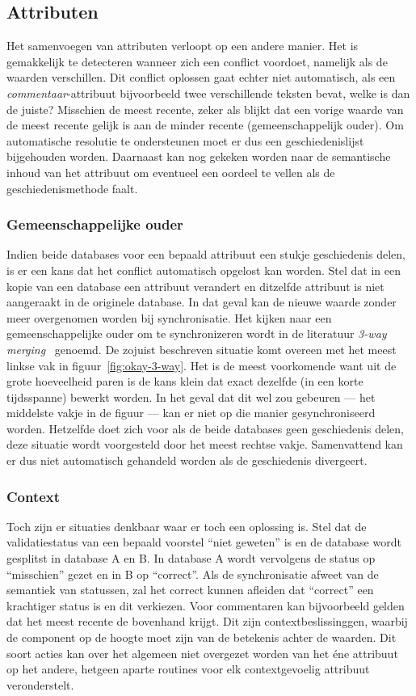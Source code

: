 \subsection{Attributen}
Het samenvoegen van attributen verloopt op een andere manier. Het is gemakkelijk te detecteren wanneer zich een conflict voordoet, namelijk als de waarden verschillen. Dit conflict oplossen gaat echter niet automatisch, als een \emph{commentaar}-attribuut bijvoorbeeld twee verschillende teksten bevat, welke is dan de juiste? Misschien de meest recente, zeker als blijkt dat een vorige waarde van de meest recente gelijk is aan de minder recente (gemeenschappelijk ouder). Om automatische resolutie te ondersteunen moet er dus een geschiedenislijst bijgehouden worden. Daarnaast kan nog gekeken worden naar de semantische inhoud van het attribuut om eventueel een oordeel te vellen als de geschiedenismethode faalt.

\subsubsection{Gemeenschappelijke ouder}
Indien beide databases voor een bepaald attribuut een stukje geschiedenis delen, is er een kans dat het conflict automatisch opgelost kan worden. Stel dat in een kopie van een database een attribuut verandert en ditzelfde attribuut is niet aangeraakt in de originele database. In dat geval kan de nieuwe waarde zonder meer overgenomen worden bij synchronisatie. Het kijken naar een gemeenschappelijke ouder om te synchronizeren wordt in de literatuur \emph{3-way merging}~\cite{sync:diff3} genoemd. De zojuist beschreven situatie komt overeen met het meest linkse vak in figuur~\ref{fig:okay-3-way}. Het is de meest voorkomende want uit de grote hoeveelheid paren is de kans klein dat exact dezelfde (in een korte tijdsspanne) bewerkt worden. In het geval dat dit wel zou gebeuren --- het middelste vakje in de figuur --- kan er niet op die manier gesynchroniseerd worden. Hetzelfde doet zich voor als de beide databases geen geschiedenis delen, deze situatie wordt voorgesteld door het meest rechtse vakje. Samenvattend kan er dus niet automatisch gehandeld worden als de geschiedenis divergeert.

\subsubsection{Context}
Toch zijn er situaties denkbaar waar er toch een oplossing is. Stel dat de validatiestatus van een bepaald voorstel ``niet geweten'' is en de database wordt gesplitst in database A en B. In database A wordt vervolgens de status op ``misschien'' gezet en in B op ``correct''. Als de synchronisatie afweet van de semantiek van statussen, zal het correct kunnen afleiden dat ``correct'' een krachtiger status is en dit verkiezen. Voor commentaren kan bijvoorbeeld gelden dat het meest recente de bovenhand krijgt. Dit zijn contextbeslissinggen, waarbij de component op de hoogte moet zijn van de betekenis achter de waarden. Dit soort acties kan over het algemeen niet overgezet worden van het \'ene attribuut op het andere, hetgeen aparte routines voor elk contextgevoelig attribuut veronderstelt.\\

